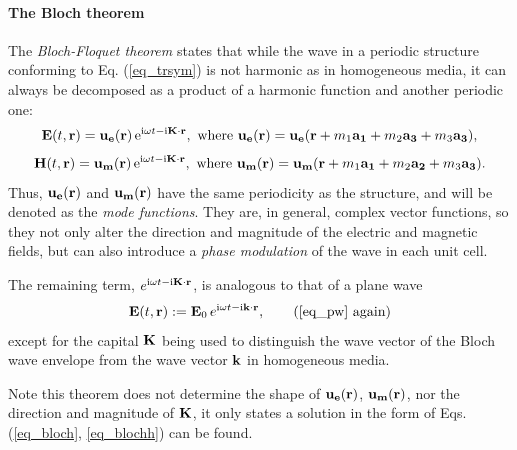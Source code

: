 \paragraph{The Bloch theorem}%
The \textit{Bloch-Floquet theorem} states that while the wave in a periodic structure conforming to Eq. (\ref{eq_trsym}) is not harmonic as in homogeneous media, it can always be decomposed as a product of a harmonic function and another periodic one:
\begin{equation} 
\mathbf{E}(t, {\mathbf{r}}) = \mathbf{u_e}({\mathbf{r}})\,\mathrm{e}^{{\mathrm i}\omega t - {\mathrm i}{\mathbf{K}}\cdot{\mathbf{r}}}, \text{ where } \mathbf{u_e}({\mathbf{r}}) = \mathbf{u_e}({\mathbf{r}} + m_1 {\mathbf{a_1}} + m_2 {\mathbf{a_3}} + m_3 {\mathbf{a_3}}),
\label{eq_bloch}\end{equation} 
\begin{equation}
\mathbf{H}(t, {\mathbf{r}}) = \mathbf{u_m}({\mathbf{r}})\,\mathrm{e}^{{\mathrm i}\omega t - {\mathrm i}{\mathbf{K}}\cdot{\mathbf{r}}}, \text{ where } \mathbf{u_m}({\mathbf{r}}) = \mathbf{u_m}({\mathbf{r}} + m_1 {\mathbf{a_1}} + m_2 {\mathbf{a_2}} + m_3 {\mathbf{a_3}}).
\label{eq_blochh}\end{equation} 
Thus, $\mathbf{u_e}({\mathbf{r}})$ and $\mathbf{u_m}({\mathbf{r}})$ have the same periodicity as the structure, and will be denoted as the \textit{mode functions}. They are, in general, complex vector functions, so they not only alter the direction and magnitude of the electric and magnetic fields, but can also introduce a \textit{phase modulation} of the wave in each unit cell. 

The remaining term, $e^{{\mathrm i}\omega t - {\mathrm i}{\mathbf{K}}\cdot{\mathbf{r}}}$, is analogous to that of a plane wave
\begin{equation} \E(t, \rr) := \E_0\, e^{\ii\omega t - \ii\kk\cdot\rr}, \tag{\ref{eq_pw} \again} \end{equation}
except for the capital ${\mathbf{K}}$ being used to distinguish the wave vector of the Bloch wave envelope from the wave vector ${\mathbf{k}}$ in homogeneous media. 

Note this theorem does not determine the shape of $\mathbf{u_e}({\mathbf{r}})$, $\mathbf{u_m}({\mathbf{r}})$, nor the direction and magnitude of ${\mathbf{K}}$, it only states a solution in the form of Eqs. (\ref{eq_bloch}, \ref{eq_blochh}) can be found.


